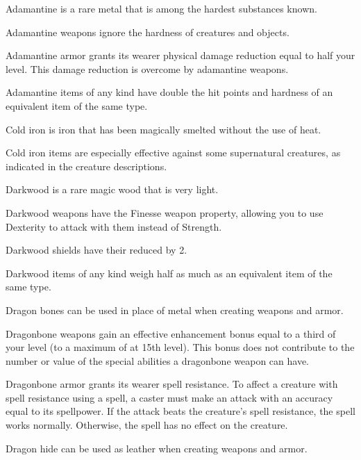         Adamantine is a rare metal that is among the hardest substances known.

        Adamantine weapons ignore the hardness of creatures and objects.

        Adamantine armor grants its wearer physical damage reduction equal to half your level.
        This damage reduction is overcome by adamantine weapons.

        Adamantine items of any kind have double the hit points and hardness of an equivalent item of the same type.


        Cold iron is iron that has been magically smelted without the use of heat.

        Cold iron items are especially effective against some supernatural creatures, as indicated in the creature descriptions.

        Darkwood is a rare magic wood that is very light.

        Darkwood weapons have the Finesse weapon property, allowing you to use Dexterity to attack with them instead of Strength.

        Darkwood shields have their  reduced by 2.

        Darkwood items of any kind weigh half as much as an equivalent item of the same type.


        Dragon bones can be used in place of metal when creating weapons and armor.

        Dragonbone weapons gain an effective enhancement bonus equal to a third of your level (to a maximum of  at 15th level).
        This bonus does not contribute to the number or value of the special abilities a dragonbone weapon can have.

        Dragonbone armor grants its wearer spell resistance.
        To affect a creature with spell resistance using a spell, a caster must make an attack with an accuracy equal to its spellpower.
        If the attack beats the creature's spell resistance, the spell works normally.
        Otherwise, the spell has no effect on the creature.


        Dragon hide can be used as leather when creating weapons and armor.

